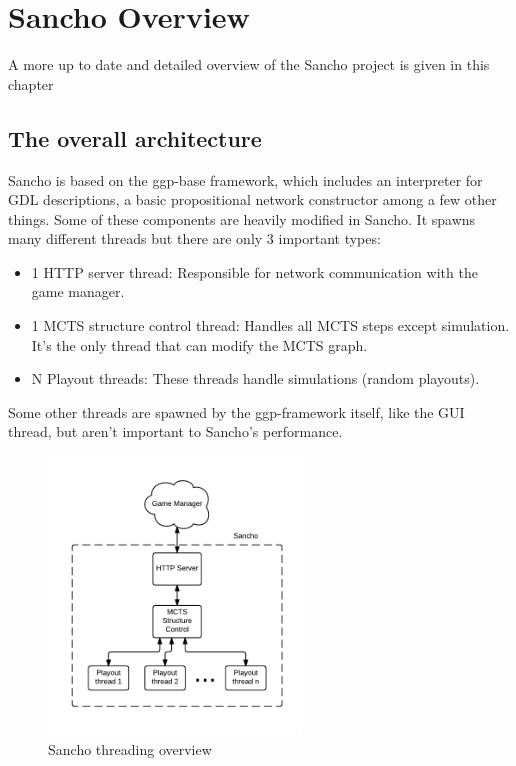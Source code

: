 
\chapter{Sancho Overview}
\label{chapter:sancho_overview}

A more up to date and detailed overview of the Sancho project is given in this chapter

\section{The overall architecture}

Sancho is based on the ggp-base framework, which includes an interpreter for GDL descriptions, a basic propositional network constructor among a few other things. Some of these components are heavily modified in Sancho.
It spawns many different threads but there are only 3 important types:

\begin{itemize}
	\item 1 HTTP server thread: Responsible for network communication with the game manager.
	\item 1 MCTS structure control thread: Handles all MCTS steps except simulation. It's the only thread that can modify the MCTS graph.
	\item N Playout threads: These threads handle simulations (random playouts).    
\end{itemize}

Some other threads are spawned by the ggp-framework itself, like the GUI thread, but aren't important to Sancho's performance.

\begin{figure}[h]
	\centering
	\includegraphics[width=0.6\textwidth]{images/Sancho_overview.pdf}
	\caption{Sancho threading overview}
	\label{fig:sancho_overview}
\end{figure}


